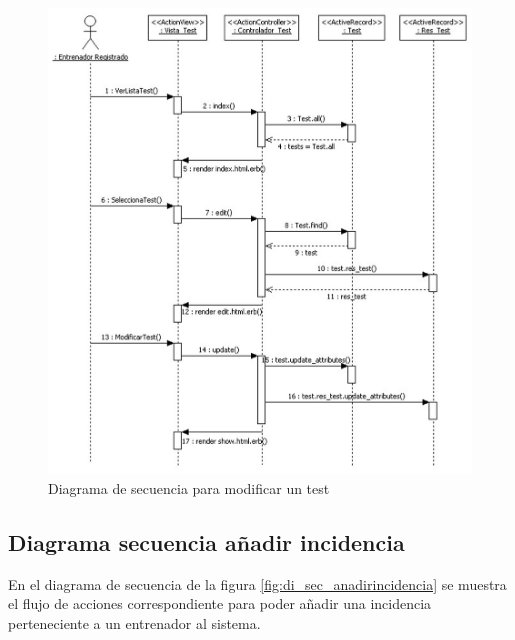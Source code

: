 		  \begin{figure}[H]
			  \centering
			    \includegraphics[width=15cm]{./eps/di_diagsecuencia/Test_Modificar.eps}
			  \caption{Diagrama de secuencia para modificar un test}
			  \label{fig:di_sec_modificartest}
			\end{figure}
			
			\newpage
		
		\subsection{Diagrama secuencia añadir incidencia} %
		  \label{sub:diagrama_secuencia_anadir_incidencia}
		
		  En el diagrama de secuencia de la figura \ref{fig:di_sec_anadirincidencia} se muestra el flujo de acciones correspondiente para poder añadir una incidencia perteneciente a un entrenador al sistema.
		  
